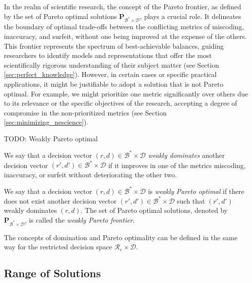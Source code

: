 In the realm of scientific research, the concept of the Pareto frontier, as defined by the set of Pareto optimal solutions $\mathbf{P}_{\mathcal{B}^\ast \times \mathcal{D}}$, plays a crucial role. It delineates the boundary of optimal trade-offs between the conflicting metrics of miscoding, inaccuracy, and surfeit, without one being improved at the expense of the others. This frontier represents the spectrum of best-achievable balances, guiding researchers to identify models and representations that offer the most scientifically rigorous understanding of their subject matter (see Section \ref{sec:perfect_knowledge}). However, in certain cases or specific practical applications, it might be justifiable to adopt a solution that is not Pareto optimal. For example, we might prioritize one metric significantly over others due to its relevance or the specific objectives of the research, accepting a degree of compromise in the non-prioritized metrics (see Section \ref{sec:minimizing_nescience}).

{\color{red} TODO: Weakly Pareto optimal}

\begin{definition}
We say that a decision vector $(r, d) \in \mathcal{B}^\ast \times \mathcal{D}$ \emph{weakly dominates} another decision vector $(r', d') \in \mathcal{B}^\ast \times \mathcal{D}$ if it improves in one of the metrics miscoding, inaccuracy, or surfeit without deteriorating the other two.
\end{definition}

\begin{definition}
We say that a decision vector $(r, d) \in \mathcal{B}^\ast \times \mathcal{D}$ is \emph{weakly Pareto optimal} if there does not exist another decision vector $(r', d') \in \mathcal{B}^\ast \times \mathcal{D}$ such that $(r', d')$ weakly dominates $(r, d)$. The set of Pareto optimal solutions, denoted by $\mathbf{P}_{\mathcal{B}^\ast \times \mathcal{D}}$, is called the \emph{weakly Pareto frontier}.
\end{definition}

{\color{red} The concepts of domination and Pareto optimality can be defined in the same way for the restricted decision space $\mathcal{R}_e \times \mathcal{D}$.}


\subsection*{Range of Solutions}

